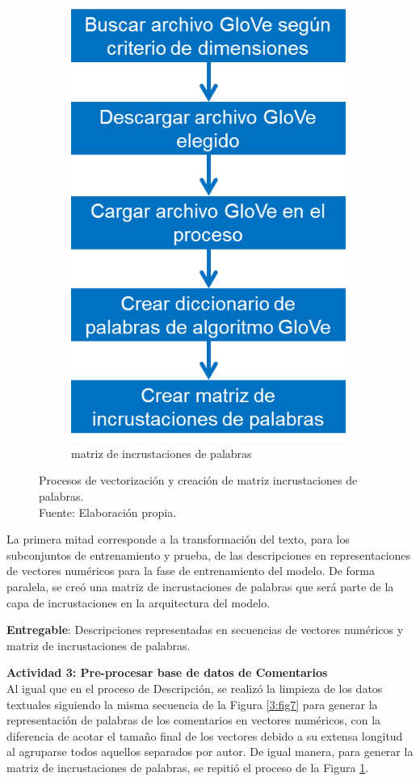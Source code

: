 \begin{figure}[!ht]
\begin{subfigure}{.50\textwidth}
		\centering
		\includegraphics[width=0.55\linewidth]{3/figures/description_embedding_matrix.png}
		\caption{matriz de incrustaciones de palabras}
	\end{subfigure}
	\caption[Procesos de vectorización y creación de matriz incrustaciones de palabras]{Procesos de vectorización y creación de matriz incrustaciones de palabras.\\
		Fuente: Elaboración propia.}
	\label{3:fig9}
\end{figure}

La primera mitad corresponde a la transformación del texto, para los subconjuntos de entrenamiento y prueba, de las descripciones en representaciones de vectores numéricos para la fase de entrenamiento del modelo. De forma paralela, se creó una matriz de incrustaciones de palabras que será parte de la capa de incrustaciones en la arquitectura del modelo.

\textbf{Entregable}: Descripciones representadas en secuencias de vectores numéricos y matriz de incrustaciones de palabras.

\textbf{Actividad 3: Pre-procesar base de datos de Comentarios}
\\
Al igual que en el proceso de Descripción, se realizó la limpieza de los datos textuales siguiendo la misma secuencia de la Figura \ref{3:fig7} para generar la representación de palabras de los comentarios en vectores numéricos, con la diferencia de acotar el tamaño final de los vectores debido a su extensa longitud al agruparse todos aquellos separados por autor. De igual manera, para generar la matriz de incrustaciones de palabras, se repitió el proceso de la Figura \ref{3:fig9}.

